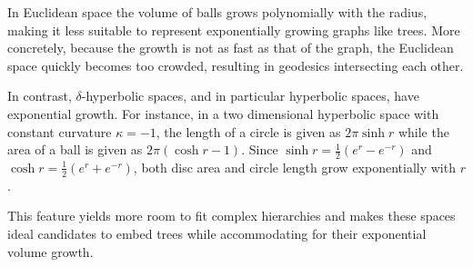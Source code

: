 In Euclidean space the volume of balls grows polynomially with the radius, making it less suitable to represent exponentially growing graphs like trees. More concretely, because the growth is not as fast as that of the graph, the Euclidean space quickly becomes too crowded, resulting in geodesics intersecting each other.

In contrast, $\delta$-hyperbolic spaces, and in particular hyperbolic spaces, have exponential growth. For instance, in a two dimensional hyperbolic space with constant curvature $\kappa = -1$, the length of a circle is given as $2\pi \sinh r$ while the area of a ball is given as $2\pi(\cosh r - 1)$. Since $\sinh r = \frac{1}{2} (e^r - e^{-r})$ and $\cosh r = \frac{1}{2} (e^r + e^{-r})$, both disc area and circle length grow exponentially with $r$. 

This feature yields more room to fit complex hierarchies and makes these spaces ideal candidates to embed trees while accommodating for their exponential volume growth. 